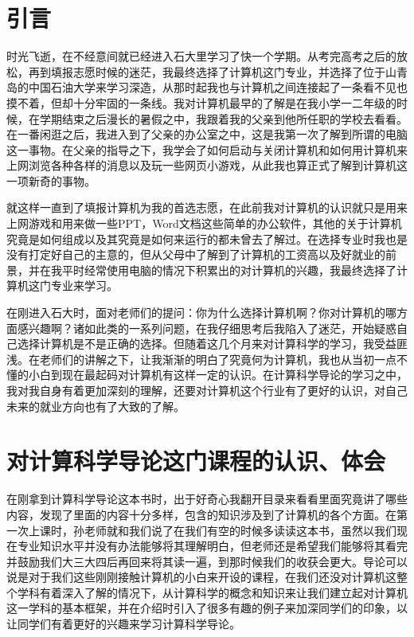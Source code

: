 \documentclass{article}
\begin{document}
\section{引言}
时光飞逝，在不经意间就已经进入石大里学习了快一个学期。从考完高考之后的放松，再到填报志愿时候的迷茫，我最终选择了计算机这门专业，并选择了位于山青岛的中国石油大学来学习深造，从那时起我也与计算机之间连接起了一条看不见也摸不着，但却十分牢固的一条线。我对计算机最早的了解是在我小学一二年级的时候，在学期结束之后漫长的暑假之中，我跟着我的父亲到他所任职的学校去看看。在一番闲逛之后，我进入到了父亲的办公室之中，这是我第一次了解到所谓的电脑这一事物。在父亲的指导之下，我学会了如何启动与关闭计算机和如何用计算机来上网浏览各种各样的消息以及玩一些网页小游戏，从此我也算正式了解到计算机这一项新奇的事物。\par
就这样一直到了填报计算机为我的首选志愿，在此前我对计算机的认识就只是用来上网游戏和用来做一些PPT，Word文档这些简单的办公软件，其他的关于计算机究竟是如何组成以及其究竟是如何来运行的都未曾去了解过。在选择专业时我也是没有打定好自己的主意的，但从父母中了解到了计算机的工资高以及好就业的前景，并在我平时经常使用电脑的情况下积累出的对计算机的兴趣，我最终选择了计算机这门专业来学习。\par
在刚进入石大时，面对老师们的提问：你为什么选择计算机啊？你对计算机的哪方面感兴趣啊？诸如此类的一系列问题，在我仔细思考后我陷入了迷茫，开始疑惑自己选择计算机是不是正确的选择。但随着这几个月来对计算科学的学习，我受益匪浅。在老师们的讲解之下，让我渐渐的明白了究竟何为计算机，我也从当初一点不懂的小白到现在最起码对计算机有这样一定的认识。在计算科学导论的学习之中，我对我自身有着更加深刻的理解，还要对计算机这个行业有了更好的认识，对自己未来的就业方向也有了大致的了解。

\section{对计算科学导论这门课程的认识、体会}
在刚拿到计算科学导论这本书时，出于好奇心我翻开目录来看看里面究竟讲了哪些内容，发现了里面的内容十分多样，包含的知识涉及到了计算机的各个方面。在第一次上课时，孙老师就和我们说了在我们有空的时候多读读这本书，虽然以我们现在专业知识水平并没有办法能够将其理解明白，但老师还是希望我们能够将其看完并鼓励我们大三大四后再回来将其读一遍，到那时候我们的收获会更大。导论可以说是对于我们这些刚刚接触计算机的小白来开设的课程，在我们还没对计算机这整个学科有着深入了解的情况下，从计算科学的概念和知识来让我们建立起对计算机这一学科的基本框架，并在介绍时引入了很多有趣的例子来加深同学们的印象，以让同学们有着更好的兴趣来学习计算科学导论。
\end{document}
